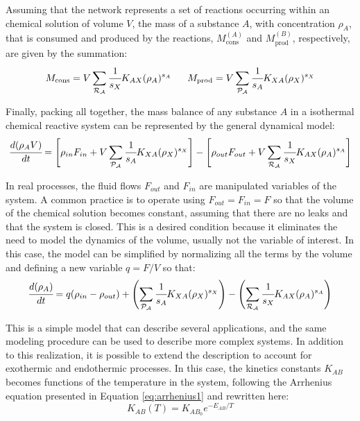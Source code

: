 \documentclass[a4paper,11pt]{book}
\numberwithin{figure}{chapter}
\numberwithin{equation}{chapter}
\numberwithin{table}{chapter}
\theoremstyle{definition}
\begin{document}
Assuming that the network represents a set of reactions occurring within an chemical solution of volume $V$, the mass of a substance $A$, with concentration $\rho_A$, that is consumed and produced by the reactions, $M^{(A)}_\text{cons}$ and $M^{(B)}_\text{prod}$, respectively, are given by the summation:
\begin{equation}
		M_\text{cons} = V \sum_{\mathcal{R_A}} \cfrac{1}{s_X} K_{AX} (\rho_A)^{s_{A}}\ \ \ \ \  M_\text{prod} = V \sum_{\mathcal{P_A}} \cfrac{1}{s_A} K_{XA} (\rho_X)^{s_{X}}
\end{equation}

Finally, packing all together, the mass balance of any substance $A$ in a isothermal chemical reactive system can be represented by the general dynamical model:
\begin{equation}
		\cfrac{d (\rho_A V)}{dt} = \left[ \rho_{in} F_{in} + V \sum_{\mathcal{P_A}} \cfrac{1}{s_A} K_{XA} (\rho_X)^{s_{X}} \right] - \left[ \rho_{out} F_{out} + V \sum_{\mathcal{R_A}} \cfrac{1}{s_X} K_{AX} (\rho_A)^{s_{A}} \right]
\end{equation}

In real processes, the fluid flows $F_{out}$ and $F_{in}$ are manipulated variables of the system. A common practice is to operate using $F_{out} = F_{in} = F$ so that the volume of the chemical solution becomes constant, assuming that there are no leaks and that the system is closed. This is a desired condition because it eliminates the need to model the dynamics of the volume, usually not the variable of interest. In this case, the model can be simplified by normalizing all the terms by the volume and defining a new variable $q = F/V$ so that:
\begin{equation} \label{eq:isoModel1}
		\cfrac{d (\rho_A)}{dt} = q (\rho_{in} - \rho_{out}) + \left( \sum_{\mathcal{P_A}} \cfrac{1}{s_A} K_{XA} (\rho_X)^{s_{X}} \right) - \left(\sum_{\mathcal{R_A}} \cfrac{1}{s_X} K_{AX} (\rho_A)^{s_{A}} \right)
\end{equation}

This is a simple model that can describe several applications, and the same modeling procedure can be used to describe more complex systems. In addition to this realization, it is possible to extend the description to account for exothermic and endothermic processes. In this case, the kinetics constants $K_{AB}$ becomes functions of the temperature in the system, following the Arrhenius equation presented in Equation \eqref{eq:arrhenius1} and rewritten here:
\begin{equation} \label{eq:arrhenius2}
	K_{AB}(T) = K_{AB_0} e^{-E_{AB} / T}
\end{equation}
\end{document}
